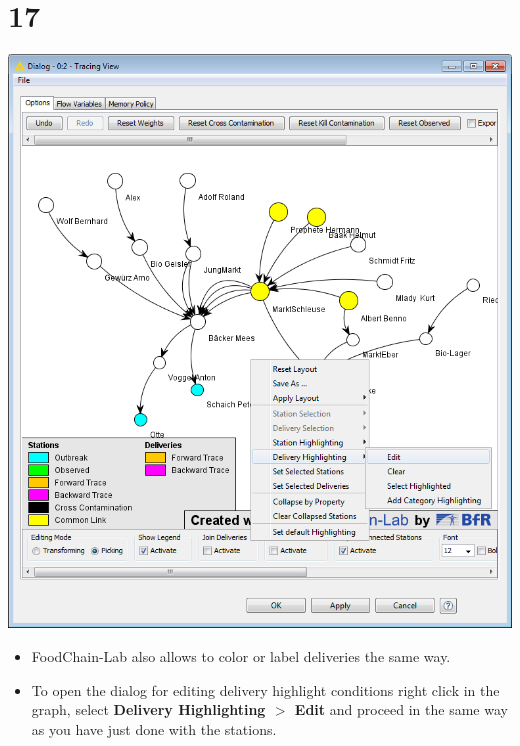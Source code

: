 \documentclass{beamer}
\begin{document}
\section{17}
\begin{frame}
	\begin{center}
  		\includegraphics[height=0.6\textheight]{17.png}
	\end{center}
	\begin{itemize}
		\item FoodChain-Lab also allows to color or label deliveries the same way.
		\item To open the dialog for editing delivery highlight conditions right click in the graph, select \textbf{Delivery Highlighting $>$ Edit} and proceed in the same way as you have just done with the stations.
	\end{itemize}
\end{frame}
\end{document}
